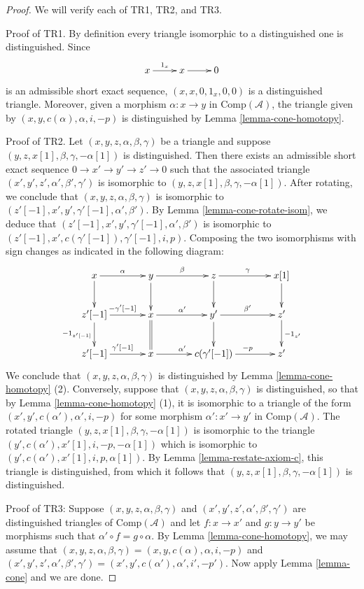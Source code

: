 \documentclass[10pt,a4paper]{amsart}
\theoremstyle{plain}
\theoremstyle{definition}
\theoremstyle{remark}
\numberwithin{equation}{subsection}
\begin{document}
\begin{proof}
We will verify each of TR1, TR2, and TR3. 

\medskip\noindent
Proof of TR1. By definition every triangle isomorphic to a distinguished
one is distinguished. Since
$$
\xymatrix{x\ar[r]^{1_x} & x\ar[r] & 0}
$$
is an admissible short exact sequence, $(x, x, 0, 1_x, 0, 0)$
is a distinguished triangle. Moreover, given a morphism
$\alpha : x \to y$ in $\text{Comp}(\mathcal{A})$, the triangle
given by $(x, y, c(\alpha), \alpha, i, -p)$ is distinguished by
Lemma \ref{lemma-cone-homotopy}.

\medskip\noindent
Proof of TR2. Let $(x,y,z,\alpha,\beta,\gamma)$ be a triangle and
suppose $(y,z,x[1],\beta,\gamma,-\alpha[1])$ is distinguished.
Then there exists an admissible short exact sequence
$0 \to x' \to y' \to z' \to 0$ such that the associated triangle
$(x',y',z',\alpha',\beta',\gamma')$ is isomorphic to
$(y,z,x[1],\beta,\gamma,-\alpha[1])$. After rotating, we conclude
that $(x,y,z,\alpha,\beta,\gamma)$ is isomorphic to
$(z'[-1],x',y', \gamma'[-1], \alpha',\beta')$. By
Lemma \ref{lemma-cone-rotate-isom},
we deduce that $(z'[-1],x',y', \gamma'[-1], \alpha',\beta')$ is
isomorphic to $(z'[-1],x',c(\gamma'[-1]), \gamma'[-1], i, p)$.
Composing the two isomorphisms with sign changes as indicated in
the following diagram:
$$
\xymatrix@C=3pc{
x\ar[r]^{\alpha}\ar[d] &
y\ar[r]^{\beta}\ar[d] &
z\ar[r]^{\gamma}\ar[d] &
x[1]\ar[d] \\
z'[-1]\ar[r]^{-\gamma'[-1]}\ar[d]_{-1_{z'[-1]}} &
x \ar[r]^{\alpha'}\ar@{=}[d] &
y' \ar[r]^{\beta'} \ar[d] &
z'\ar[d]^{-1_{z'}} \\
z'[-1]\ar[r]^{\gamma'[-1]} &
x \ar[r]^{\alpha'} &
c(\gamma'[-1]) \ar[r]^{-p} &
z'
}
$$
We conclude that $(x,y,z,\alpha,\beta,\gamma)$ is distinguished by
Lemma \ref{lemma-cone-homotopy} (2). Conversely, suppose that
$(x,y,z,\alpha,\beta,\gamma)$ is distinguished, so that by
Lemma \ref{lemma-cone-homotopy} (1), it is isomorphic to a
triangle of the form $(x',y', c(\alpha'), \alpha', i, -p)$
for some morphism $\alpha': x' \to y'$ in $\text{Comp}(\mathcal{A})$.
The rotated triangle $(y,z,x[1],\beta,\gamma, -\alpha[1])$ is
isomorphic to the triangle $(y',c(\alpha'), x'[1], i, -p, -\alpha[1])$
which is isomorphic to $(y',c(\alpha'), x'[1], i, p, \alpha[1])$.
By Lemma \ref{lemma-restate-axiom-c}, this triangle is distinguished,
from which it follows that $(y,z,x[1], \beta,\gamma, -\alpha[1])$
is distinguished.

\medskip\noindent
Proof of TR3: Suppose $(x,y,z, \alpha,\beta,\gamma)$ and
$(x',y',z',\alpha',\beta',\gamma')$ are distinguished triangles
of $\text{Comp}(\mathcal{A})$ and let $f: x \to x'$ and
$g: y \to y'$ be morphisms such that
$\alpha' \circ f = g \circ \alpha$. By
Lemma \ref{lemma-cone-homotopy}, we may assume that
$(x,y,z,\alpha,\beta,\gamma)= (x,y,c(\alpha),\alpha, i, -p)$
and $(x',y',z', \alpha',\beta',\gamma')= (x',y',c(\alpha'), \alpha',i',-p')$.
Now apply Lemma \ref{lemma-cone}
and we are done.
\end{proof}
\end{document}
